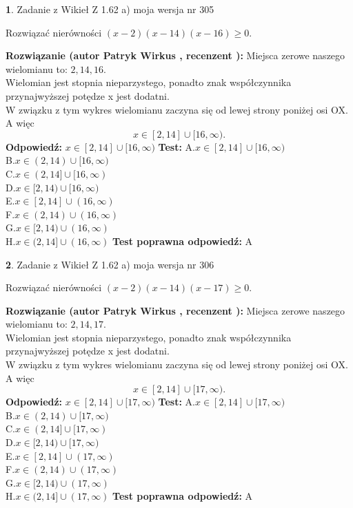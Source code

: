 \documentclass[12pt, a4paper]{article}
\theoremstyle{definition} %
\newtheorem{zad}{}
\newcommand{\zadStart}[1]{\begin{zad}#1\newline}
\newcommand{\zadStop}{\end{zad}}
\newcommand{\rozwStart}[2]{\noindent \textbf{Rozwiązanie (autor #1 , recenzent #2): }\newline}
\newcommand{\rozwStop}{\newline}
\newcommand{\odpStart}{\noindent \textbf{Odpowiedź:}\newline}
\newcommand{\odpStop}{\newline}
\newcommand{\testStart}{\noindent \textbf{Test:}\newline}
\newcommand{\testStop}{\newline}
\newcommand{\kluczStart}{\noindent \textbf{Test poprawna odpowiedź:}\newline}
\newcommand{\kluczStop}{\newline}
\begin{document}
\zadStart{Zadanie z Wikieł Z 1.62 a) moja wersja nr 305}

Rozwiązać nierówności $(x-2)(x-14)(x-16)\ge0$.
\zadStop
\rozwStart{Patryk Wirkus}{}
Miejsca zerowe naszego wielomianu to: $2, 14, 16$.\\
Wielomian jest stopnia nieparzystego, ponadto znak współczynnika przy\linebreak najwyższej potędze x jest dodatni.\\ W związku z tym wykres wielomianu zaczyna się od lewej strony poniżej osi OX. A więc $$x \in [2,14] \cup [16,\infty).$$
\rozwStop
\odpStart
$x \in [2,14] \cup [16,\infty)$
\odpStop
\testStart
A.$x \in [2,14] \cup [16,\infty)$\\
B.$x \in (2,14) \cup [16,\infty)$\\
C.$x \in (2,14] \cup [16,\infty)$\\
D.$x \in [2,14) \cup [16,\infty)$\\
E.$x \in [2,14] \cup (16,\infty)$\\
F.$x \in (2,14) \cup (16,\infty)$\\
G.$x \in [2,14) \cup (16,\infty)$\\
H.$x \in (2,14] \cup (16,\infty)$
\testStop
\kluczStart
A
\kluczStop



\zadStart{Zadanie z Wikieł Z 1.62 a) moja wersja nr 306}

Rozwiązać nierówności $(x-2)(x-14)(x-17)\ge0$.
\zadStop
\rozwStart{Patryk Wirkus}{}
Miejsca zerowe naszego wielomianu to: $2, 14, 17$.\\
Wielomian jest stopnia nieparzystego, ponadto znak współczynnika przy\linebreak najwyższej potędze x jest dodatni.\\ W związku z tym wykres wielomianu zaczyna się od lewej strony poniżej osi OX. A więc $$x \in [2,14] \cup [17,\infty).$$
\rozwStop
\odpStart
$x \in [2,14] \cup [17,\infty)$
\odpStop
\testStart
A.$x \in [2,14] \cup [17,\infty)$\\
B.$x \in (2,14) \cup [17,\infty)$\\
C.$x \in (2,14] \cup [17,\infty)$\\
D.$x \in [2,14) \cup [17,\infty)$\\
E.$x \in [2,14] \cup (17,\infty)$\\
F.$x \in (2,14) \cup (17,\infty)$\\
G.$x \in [2,14) \cup (17,\infty)$\\
H.$x \in (2,14] \cup (17,\infty)$
\testStop
\kluczStart
A
\kluczStop
\end{document}

